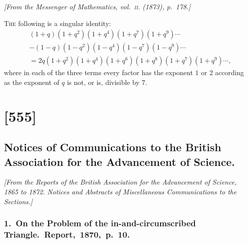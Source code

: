\documentclass[11pt,a4paper]{article}
\theoremstyle{plain}
\theoremstyle{definition}
\begin{document}
\begin{center}
\textit{[From the Messenger of Mathematics, vol.~\textsc{ii}. (1873), p.~178.]}
\end{center}

\textsc{The} following is a singular identity:
\begin{align*}
&(1 + q)(1 + q^2)(1 + q^4)(1 + q^7)(1 + q^9) \cdots \\
& - (1 - q)(1 - q^2)(1 - q^4)(1 - q^7)(1 - q^9) \cdots \\
& = 2q(1 + q^2)(1 + q^4)(1 + q^6)(1 + q^8)(1 + q^7)(1 + q^9) \cdots,
\end{align*}
where in each of the three terms every factor has the exponent $1$ or $2$ according as
the exponent of $q$ is not, or is, divisible by $7$.

\clearpage

\section{[555]}
\subsection{Notices of Communications to the British Association for the Advancement of Science.}

\begin{center}
\textit{[From the Reports of the British Association for the Advancement of Science, 1865 to 1872. Notices and Abstracts of Miscellaneous Communications to the Sections.]}
\end{center}

\subsubsection*{1.\ On the Problem of the in-and-circumscribed Triangle.\ Report,\ 1870,\ p.\ 10.}
\end{document}
